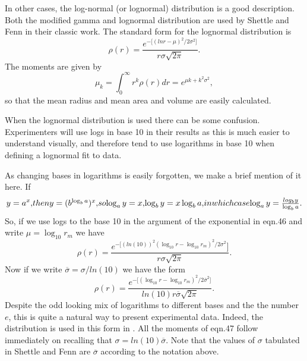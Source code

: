\documentclass[12pt]{article}
\begin{document}
\begin{flushleft}
In other cases, the log-normal (or lognormal) distribution is a good description.
Both the modified gamma and lognormal distribution are used by
Shettle and Fenn \cite{ShettleFenn:Miebib} in their classic work.
The standard form for the lognormal distribution is
\begin{equation}
\rho(r)= \frac{ e^{-\lbrack (ln r-\mu)^2/2 \sigma^2 \rbrack} }{ r \sigma \sqrt{2 \pi}}.
\end{equation}
The moments are given by
\begin{equation}
\mu_k= \int_0^\infty r^k \rho(r) dr=e^{\mu k +k^2 \sigma^2},
\end{equation}
so that the mean radius and mean area and volume are easily calculated.

When the lognormal distribution is used there can be some confusion.
Experimenters will use logs in base 10 in their results as this is much 
easier to understand visually, and therefore tend to use logarithms in base 10
when defining a lognormal fit to data.

As changing bases in logarithms is easily forgotten, we make a brief mention
of it here. If
\begin{equation}
y=a^x,
$$ then  $$
y=(b^{\log_b a})^x,
$$    so $$
\log_a y = x, 
$$    $$
\log_b y = x \log_b a,
$$ in which case $$
\log_a y= \frac{log_b y}{\log_b a}.
\end{equation}
So, if we use  logs to the base 10 in the argument of the exponential in eqn.46
and write $\mu =\log_{10} r_m$ we have
\begin{equation}
\rho(r)= \frac{ e^{ -\lbrack (ln(10))^2(\log_{10} r  -\log_{10} r_m)^2/2 \sigma^2}\rbrack }{ r \sigma \sqrt{2 \pi}}.
\end{equation}
Now if we write $ {\overline \sigma} = \sigma/ln(10)$ we have the form
\begin{equation}
\rho(r)= \frac{ e^{ -\lbrack(\log_{10} r  -\log_{10} r_m)^2/2
 {\overline \sigma}^2 \rbrack} }{ln(10) r {\overline\sigma} \sqrt{2 \pi}}.
\end{equation}
Despite the odd looking mix of logarithms to different bases and the the number $e$,
this is quite a natural way to present experimental data. Indeed, the distribution
is used in this form in \cite{ShettleFenn:Miebib}. All the moments of eqn.47 follow 
immediately on recalling that $\sigma = ln(10) {\overline \sigma}$. Note
that the values of $\sigma$ tabulated in Shettle and Fenn are ${\overline \sigma}$
according to the notation above.


\end{flushleft}
\end{document}
